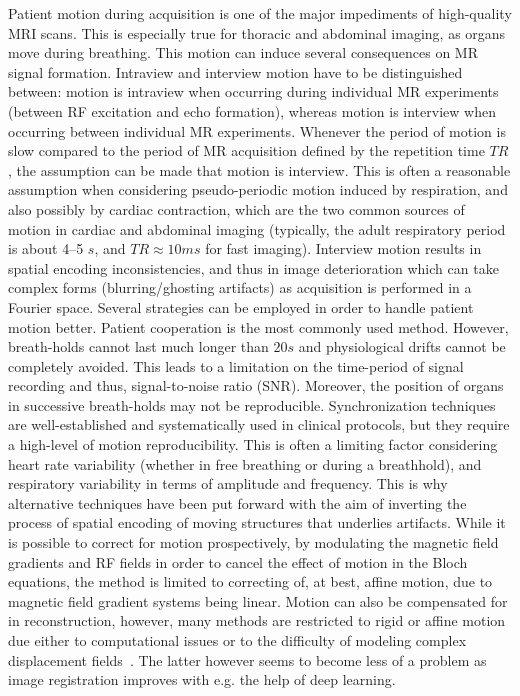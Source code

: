 \documentclass[english,version-2022-01]{uzl-thesis} %
\begin{document}
Patient motion during acquisition is one of the major impediments of high-quality MRI scans. This is especially true for thoracic and abdominal imaging, as organs move during breathing. This motion can induce several consequences on MR signal formation. Intraview and interview motion have to be distinguished between: motion is intraview when occurring during individual MR experiments (between RF excitation and echo formation), whereas motion is interview when occurring between individual MR experiments. Whenever the period of motion is slow compared to the period of MR acquisition defined by the repetition time $TR$, the assumption can be made that motion is interview. This is often a reasonable assumption when considering pseudo-periodic motion induced by respiration, and also possibly by cardiac contraction, which are the two common sources of motion in cardiac and abdominal imaging (typically, the adult respiratory period is about 4–5 $s$, and $TR \approx 10 ms$ for fast imaging). Interview motion results in spatial encoding inconsistencies, and thus in image deterioration which can take complex forms (blurring/ghosting artifacts) as acquisition is performed in a Fourier space. Several strategies can be employed in order to handle patient motion better. Patient cooperation is the most commonly used method. However, breath-holds cannot last much longer than $20 s$ and physiological drifts cannot be completely avoided. This leads to a limitation on the time-period of signal recording and thus, signal-to-noise ratio (SNR). Moreover, the position of organs in successive breath-holds may not be reproducible. Synchronization techniques are well-established and systematically used in clinical protocols, but they require a high-level of motion reproducibility. This is often a limiting factor considering heart rate variability (whether in free breathing or during a breathhold), and respiratory variability in terms of amplitude and frequency. This is why alternative techniques have been put forward with the aim of inverting the process of spatial encoding of moving structures that underlies artifacts. While it is possible to correct for motion prospectively, by modulating the magnetic field gradients and RF fields in order to cancel the effect of motion in the Bloch equations, the method is limited to correcting of, at best, affine motion, due to magnetic field gradient systems being linear. Motion can also be compensated for in reconstruction, however, many methods are restricted to rigid or affine motion due either to computational issues or to the difficulty of modeling complex displacement fields~\cite{GRICS}. The latter however seems to become less of a problem as image registration improves with e.g. the help of deep learning.\\
\end{document}
